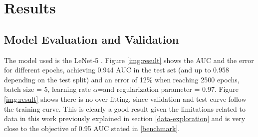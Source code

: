 \documentclass[]{article}
\begin{document}
\section{Results}\label{iv.-results}


\subsection{Model Evaluation and Validation}\label{model-evaluation-and-validation}

The model used is the LeNet-5 \cite{Lecun98}. Figure \ref{img:result} shows the AUC and the error for different epochs, achieving 0.944 AUC in the test set (and up to 0.958 depending on the test split) and an error of 12\% when reaching 2500 epochs, batch size = 5, learning rate $\alpha$=\lr and regularization parameter = 0.97. Figure \ref{img:result} shows there is no over-fitting, since validation and test curve follow the training curve.  This is clearly a good result given the limitations related to data in this work previously explained in section \ref{data-exploration} and is very close to the objective of 0.95 AUC stated in \ref{benchmark}.
\end{document}
